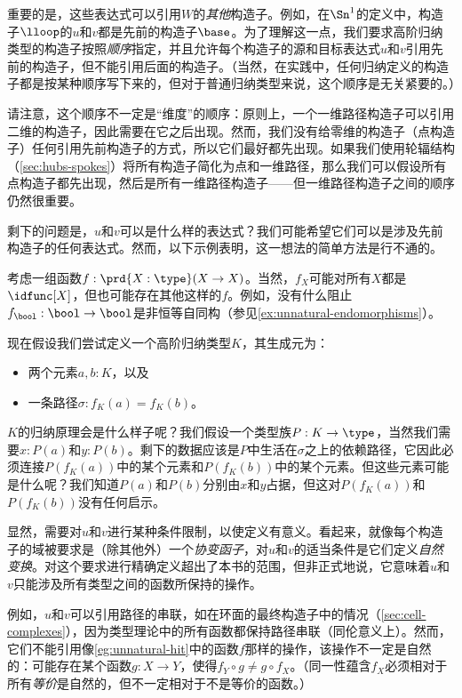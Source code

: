 重要的是，这些表达式可以引用$W$的\emph{其他}构造子。例如，在$\Sn^1$的定义中，构造子$\lloop$的$u$和$v$都是先前的构造子$\base$。为了理解这一点，我们要求高阶归纳类型的构造子按照\emph{顺序}指定，并且允许每个构造子的源和目标表达式$u$和$v$引用先前的构造子，但不能引用后面的构造子。（当然，在实践中，任何归纳定义的构造子都是按某种顺序写下来的，但对于普通归纳类型来说，这个顺序是无关紧要的。）

请注意，这个顺序不一定是“维度”的顺序：原则上，一个一维路径构造子可以引用二维的构造子，因此需要在它之后出现。然而，我们没有给零维的构造子（点构造子）任何引用先前构造子的方式，所以它们最好都先出现。如果我们使用轮辐结构（\cref{sec:hubs-spokes}）将所有构造子简化为点和一维路径，那么我们可以假设所有点构造子都先出现，然后是所有一维路径构造子——但一维路径构造子之间的顺序仍然很重要。

剩下的问题是，$u$和$v$可以是什么样的表达式？我们可能希望它们可以是涉及先前构造子的任何表达式。然而，以下示例表明，这一想法的简单方法是行不通的。

\begin{eg}\label{eg:unnatural-hit}
考虑一组函数$f:\prd{X:\type} (X\to X)$。当然，$f_X$可能对所有$X$都是$\idfunc[X]$，但也可能存在其他这样的$f$。例如，没有什么阻止$f_{\bool}:\bool\to\bool$是非恒等自同构（参见\cref{ex:unnatural-endomorphisms}）。

现在假设我们尝试定义一个高阶归纳类型$K$，其生成元为：
\begin{itemize}
  \item 两个元素$a,b:K$，以及
  \item 一条路径$\sigma:f_K(a)=f_K(b)$。
\end{itemize}
$K$的归纳原理会是什么样子呢？我们假设一个类型族$P:K\to\type$，当然我们需要$x:P(a)$和$y:P(b)$。剩下的数据应该是$P$中生活在$\sigma$之上的依赖路径，它因此必须连接$P(f_K(a))$中的某个元素和$P(f_K(b))$中的某个元素。但这些元素可能是什么呢？我们知道$P(a)$和$P(b)$分别由$x$和$y$占据，但这对$P(f_K(a))$和$P(f_K(b))$没有任何启示。
\end{eg}

显然，需要对$u$和$v$进行某种条件限制，以使定义有意义。看起来，就像每个构造子的域被要求是（除其他外）一个\emph{协变函子}，对$u$和$v$的适当条件是它们定义\emph{自然变换}。对这个要求进行精确定义超出了本书的范围，但非正式地说，它意味着$u$和$v$只能涉及所有类型之间的函数所保持的操作。

例如，$u$和$v$可以引用路径的串联，如在环面的最终构造子中的情况（\cref{sec:cell-complexes}），因为类型理论中的所有函数都保持路径串联（同伦意义上）。然而，它们不能引用像\cref{eg:unnatural-hit}中的函数$f$那样的操作，该操作不一定是自然的：可能存在某个函数$g:X\to Y$，使得$f_Y \circ g \neq g\circ f_X$。（同一性蕴含$f_X$必须相对于所有\emph{等价}是自然的，但不一定相对于不是等价的函数。）

